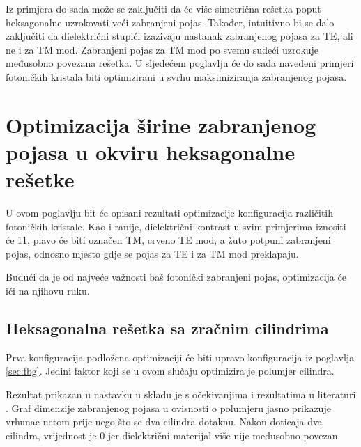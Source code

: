 \documentclass[utf8, seminar, numeric]{fer}
\begin{document}
Iz primjera do sada može se zaključiti da će više simetrična rešetka poput
heksagonalne uzrokovati veći zabranjeni pojas. Također, intuitivno bi se dalo
zaključiti da dielektrični stupići izazivaju nastanak zabranjenog pojasa za TE,
ali ne i za TM mod. Zabranjeni pojas za TM mod po svemu sudeći uzrokuje
međusobno povezana rešetka. U sljedećem poglavlju će do sada navedeni
primjeri fotoničkih kristala biti optimizirani u svrhu maksimiziranja zabranjenog
pojasa.

\chapter{Optimizacija širine zabranjenog pojasa u okviru heksagonalne rešetke}

U ovom poglavlju bit će opisani rezultati optimizacije konfiguracija različitih
fotoničkih kristale. Kao i ranije, dielektrični kontrast u svim primjerima
iznositi će 11, plavo će biti označen TM, crveno TE mod, a žuto potpuni
zabranjeni pojas, odnosno mjesto gdje se pojas za TE i za TM mod preklapaju.

Budući da je od  najveće važnosti baš fotonički zabranjeni pojas, optimizacija
će ići na njihovu ruku.

\section{Heksagonalna rešetka sa zračnim cilindrima}\label{section:cyl}

Prva konfiguracija podložena optimizaciji će biti upravo konfiguracija iz
poglavlja \ref{sec:fbg}. Jedini faktor koji se u ovom slučaju optimizira je
polumjer cilindra.

Rezultat prikazan u nastavku u skladu je s očekivanjima i rezultatima u literaturi
\cite{joannopoulos2011photonic}. Graf dimenzije zabranjenog pojasa  u ovisnosti o
polumjeru jasno prikazuje vrhunac netom prije nego što se dva cilindra dotaknu.
Nakon doticaja dva cilindra, vrijednost je 0 jer dielektrični materijal više nije
međusobno povezan.
\end{document}

